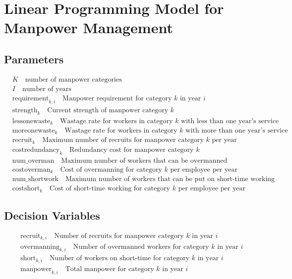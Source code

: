 \documentclass{article}
\begin{document}
\section*{Linear Programming Model for Manpower Management}

\subsection*{Parameters}
\begin{align*}
& K \quad \text{number of manpower categories} \\
& I \quad \text{number of years} \\
& \text{requirement}_{k,i} \quad \text{Manpower requirement for category } k \text{ in year } i \\
& \text{strength}_{k} \quad \text{Current strength of manpower category } k \\
& \text{lessonewaste}_{k} \quad \text{Wastage rate for workers in category } k \text{ with less than one year's service} \\
& \text{moreonewaste}_{k} \quad \text{Wastage rate for workers in category } k \text{ with more than one year's service} \\
& \text{recruit}_{k} \quad \text{Maximum number of recruits for manpower category } k \text{ per year} \\
& \text{costredundancy}_{k} \quad \text{Redundancy cost for manpower category } k \\
& \text{num\_overman} \quad \text{Maximum number of workers that can be overmanned} \\
& \text{costoverman}_{k} \quad \text{Cost of overmanning for category } k \text{ per employee per year} \\
& \text{num\_shortwork} \quad \text{Maximum number of workers that can be put on short-time working} \\
& \text{costshort}_{k} \quad \text{Cost of short-time working for category } k \text{ per employee per year}
\end{align*}

\subsection*{Decision Variables}
\begin{align*}
& \text{recruit}_{k,i} \quad \text{Number of recruits for manpower category } k \text{ in year } i \\
& \text{overmanning}_{k,i} \quad \text{Number of overmanned workers for category } k \text{ in year } i \\
& \text{short}_{k,i} \quad \text{Number of workers on short-time for category } k \text{ in year } i \\
& \text{manpower}_{k,i} \quad \text{Total manpower for category } k \text{ in year } i
\end{align*}
\end{document}
